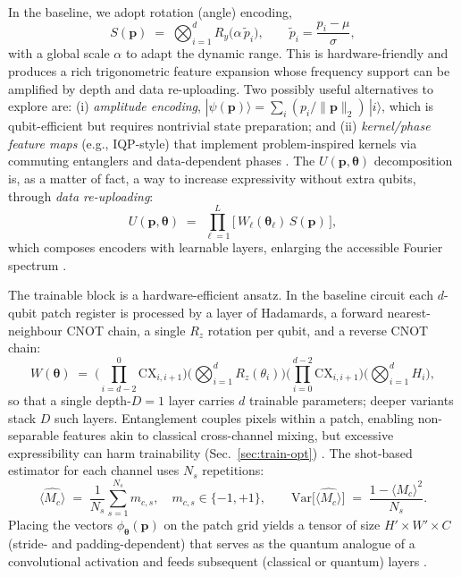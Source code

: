 In the baseline, we adopt rotation (angle) encoding,
\begin{equation}
S(\mathbf{p}) \;=\; \bigotimes_{i=1}^{d} R_y\!\big(\alpha\,\tilde p_i\big), \qquad \tilde p_i = \frac{p_i-\mu}{\sigma},
\label{eq:angle-enc}
\end{equation}
with a global scale $\alpha$ to adapt the dynamic range. This is hardware-friendly and produces a rich trigonometric feature expansion whose frequency support can be amplified by depth and data re-uploading. Two possibly useful alternatives to explore are: (i) \emph{amplitude encoding}, $|\psi(\mathbf{p})\rangle = \sum_{i} (p_i/\|\mathbf{p}\|_2)\,|i\rangle$, which is qubit-efficient but requires nontrivial state preparation; and (ii) \emph{kernel/phase feature maps} (e.g., IQP-style) that implement problem-inspired kernels via commuting entanglers and data-dependent phases \cite{Havlicek2019, Schuld2020Expressivity}. 
The $U(\mathbf{p},\boldsymbol{\theta})$ decomposition is, as a matter of fact, a way to increase expressivity without extra qubits, through \emph{data re-uploading}:
\begin{equation}
U(\mathbf{p},\boldsymbol{\theta}) \;=\; \prod_{\ell=1}^{L}\Big[\, W_\ell(\boldsymbol{\theta}_\ell)\,S(\mathbf{p}) \,\Big],
\label{eq:reupload}
\end{equation}
which composes encoders with learnable layers, enlarging the accessible Fourier spectrum \cite{PerezSalinas2020, Schuld2020Expressivity}.

The trainable block is a hardware-efficient ansatz. In the baseline circuit each $d$-qubit patch register is processed by a layer of Hadamards, a forward nearest-neighbour CNOT chain, a single $R_z$ rotation per qubit, and a reverse CNOT chain:
\begin{equation}
W(\boldsymbol{\theta}) \;=\; \Big(\!\!\prod_{i=d-2}^{0}\!\mathrm{CX}_{i,i+1}\Big)\Big(\bigotimes_{i=1}^{d} R_z(\theta_{i})\Big)\Big(\prod_{i=0}^{d-2}\mathrm{CX}_{i,i+1}\Big)\Big(\bigotimes_{i=1}^{d} H_i\Big),
\label{eq:hea}
\end{equation}
so that a single depth-$D{=}1$ layer carries $d$ trainable parameters; deeper variants stack $D$ such layers. Entanglement couples pixels within a patch, enabling non-separable features akin to classical cross-channel mixing, but excessive expressibility can harm trainability (Sec.~\ref{sec:train-opt}) \cite{Cong2019,Holmes2022PRXQ,Marrero2021PRXQ}. The shot-based estimator for each channel uses $N_s$ repetitions:
\begin{equation}
\widehat{\langle M_c\rangle} \;=\; \frac{1}{N_s}\sum_{s=1}^{N_s} m_{c,s},\quad m_{c,s}\in\{-1,+1\},\qquad
\mathrm{Var}\big[\widehat{\langle M_c\rangle}\big] \;=\; \frac{1-\langle M_c\rangle^2}{N_s}.
\label{eq:shotvar}
\end{equation}
Placing the vectors $\phi_{\boldsymbol{\theta}}(\mathbf{p})$ on the patch grid yields a tensor of size $H'\times W'\times C$ (stride- and padding-dependent) that serves as the quantum analogue of a convolutional activation and feeds subsequent (classical or quantum) layers \cite{LeCun1998,Cong2019}.

